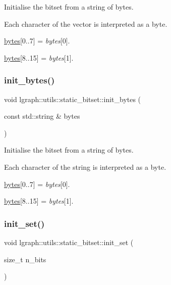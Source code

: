 Initialise the bitset from a string of bytes. 

Each character of the vector is interpreted as a byte.

\hyperlink{classlgraph_1_1utils_1_1static__bitset_a56d277fc22bbf71a27fca530a133c9bd}{bytes}\mbox{[}0..7\mbox{]} = {\itshape bytes}\mbox{[}0\mbox{]}.

\hyperlink{classlgraph_1_1utils_1_1static__bitset_a56d277fc22bbf71a27fca530a133c9bd}{bytes}\mbox{[}8..15\mbox{]} = {\itshape bytes}\mbox{[}1\mbox{]}. \mbox{\label{classlgraph_1_1utils_1_1static__bitset_a8fe9cefb9a05d30b1586810c6ccda923}} 
\subsubsection{\texorpdfstring{init\+\_\+bytes()}{init\_bytes()}\hspace{0.1cm}{\footnotesize\ttfamily [2/2]}}
{\footnotesize\ttfamily void lgraph\+::utils\+::static\+\_\+bitset\+::init\+\_\+bytes (\begin{DoxyParamCaption}\item[{const std\+::string \&}]{bytes }\end{DoxyParamCaption})}



Initialise the bitset from a string of bytes. 

Each character of the string is interpreted as a byte.

\hyperlink{classlgraph_1_1utils_1_1static__bitset_a56d277fc22bbf71a27fca530a133c9bd}{bytes}\mbox{[}0..7\mbox{]} = {\itshape bytes}\mbox{[}0\mbox{]}.

\hyperlink{classlgraph_1_1utils_1_1static__bitset_a56d277fc22bbf71a27fca530a133c9bd}{bytes}\mbox{[}8..15\mbox{]} = {\itshape bytes}\mbox{[}1\mbox{]}. \mbox{\label{classlgraph_1_1utils_1_1static__bitset_a706ac4c15ed634b9087582cacc107acc}} 
\subsubsection{\texorpdfstring{init\+\_\+set()}{init\_set()}}
{\footnotesize\ttfamily void lgraph\+::utils\+::static\+\_\+bitset\+::init\+\_\+set (\begin{DoxyParamCaption}\item[{size\+\_\+t}]{n\+\_\+bits }\end{DoxyParamCaption})}




